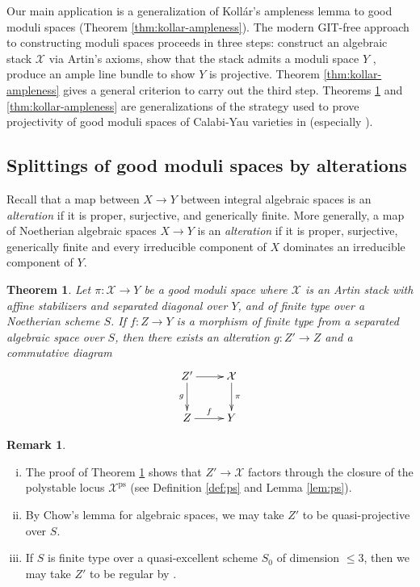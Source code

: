 \documentclass{amsart}
\newtheorem{theorem}{Theorem}[section]
\theoremstyle{definition}
\newtheorem{remark}[remark]{Remark}
\newcommand{\cX}{\mathcal{X}}
\DeclareMathOperator{\ps}{ps}
\begin{document}
	Our main application is a generalization of Koll\'ar's ampleness lemma to good moduli spaces (Theorem \ref{thm:kollar-ampleness}). The modern GIT-free approach to constructing moduli spaces proceeds in three steps: construct an algebraic stack $\cX$ via Artin's axioms, show that the stack admits a moduli space $Y$ \cite{keelmori, AHLH}, produce an ample line bundle to show $Y$ is projective. Theorem \ref{thm:kollar-ampleness} gives a general criterion to carry out the third step. Theorems \ref{thm:main-gms-splitting} and \ref{thm:kollar-ampleness} are generalizations of the strategy used to prove projectivity of good moduli spaces of Calabi-Yau  varieties in \cite{ABBDILW} (especially \cite[Theorem 14.11]{ABBDILW}). 
	
	\subsection{Splittings of good moduli spaces by alterations}
	
	Recall that a map between $X \to Y$ between integral algebraic spaces is an \emph{alteration} if it is proper, surjective, and generically finite. More generally, a map of Noetherian algebraic spaces $X \to Y$ is an \emph{alteration} if it is proper, surjective, generically finite and every irreducible component of $X$ dominates an irreducible component of $Y$. 
	
	
	\begin{theorem}\label{thm:main-gms-splitting}
		Let $\pi\colon\cX\to Y$ be a good moduli space where 
		$\cX$ is an Artin stack with affine stabilizers and separated diagonal over  $Y$, and of finite type over a Noetherian scheme $S$. If $f\colon Z\to Y$ is a morphism of finite type from a separated algebraic space over $S$, then there exists an alteration $g\colon Z'\to Z$ and a commutative diagram
		\[
		\xymatrix{
			Z'\ar[r]\ar[d]_-{g} & \cX\ar[d]^-{\pi}\\
			Z\ar[r]^-{f} & Y
		}
		\]
	\end{theorem}
	
	\begin{remark}\label{rmk:properlystable-factorization}
		\begin{enumerate}[(i)]
			\item The proof of Theorem \ref{thm:main-gms-splitting} shows that $Z'\to\cX$ factors through the closure of the polystable locus $\cX^{\ps}$ (see Definition \ref{def:ps} and Lemma \ref{lem:ps}).
			\item By Chow's lemma for algebraic spaces, we may take $Z'$ to be quasi-projective over $S$. 
			\item If $S$ is finite type over a quasi-excellent scheme $S_0$ of dimension $\le 3$, then we may take $Z'$ to be regular by \cite[Theorem 1.2.5]{Temkin2017}.
		\end{enumerate}
	\end{remark}
	
\end{document}
